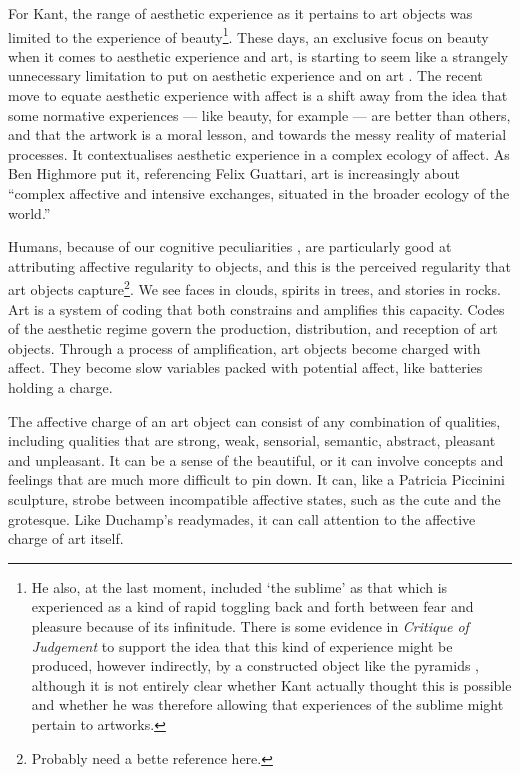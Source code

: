 \documentclass[letterpaper]{article}
\begin{document}
    For Kant, the range of aesthetic experience as it pertains to art objects was limited to the experience of beauty\footnote{
        He also, at the last moment, included ‘the sublime’ \citep[p.15]{ZepkeSblmArt2017} as that which is experienced as a kind of rapid toggling back and forth between fear and pleasure \citep[p.88]{KantCrtqOfJdgmnt} because of its infinitude. There is some evidence in \emph{Critique of Judgement} to support the idea that this kind of experience might be produced, however indirectly, by a constructed object like the pyramids \citep[p.82]{KantCrtqOfJdgmnt}, although it is not entirely clear whether Kant actually thought this is possible and whether he was therefore allowing that experiences of the sublime might pertain to artworks.
    }. These days, an exclusive focus on beauty when it comes to aesthetic experience and art, is starting to seem like a strangely unnecessary limitation to put on aesthetic experience and on art \citep[pp.121-122]{HighmoreBttrAftrTst2010}. The recent move to equate aesthetic experience with affect is a shift away from the idea that some normative experiences — like beauty, for example — are better than others, and that the artwork is a moral lesson, and towards the messy reality of material processes. It contextualises aesthetic experience in a complex ecology of affect. As Ben Highmore put it, referencing Felix Guattari, art is increasingly about “complex affective and intensive exchanges, situated in the broader ecology of the world.” \citep[p.155]{HighmoreBttrAftrTst2010}

    Humans, because of our cognitive peculiarities \citep{DeaconTheSymbolicSpecies1998}, are particularly good at attributing affective regularity to objects, and this is the perceived regularity that art objects capture\footnote{
        Probably need a bette reference here.
    }. We see faces in clouds, spirits in trees, and stories in rocks. Art is a system of coding that both constrains and amplifies this capacity. Codes of the aesthetic regime govern the production, distribution, and reception of art objects. Through a process of amplification, art objects become charged with affect. They become slow variables packed with potential affect, like batteries holding a charge.

    The affective charge of an art object can consist of any combination of qualities, including qualities that are strong, weak, sensorial, semantic, abstract, pleasant and unpleasant. It can be a sense of the beautiful, or it can involve concepts and feelings that are much more difficult to pin down. It can, like a Patricia Piccinini sculpture, strobe between incompatible affective states, such as the cute and the grotesque. Like Duchamp's readymades, it can call attention to the affective charge of art itself.
\end{document}
